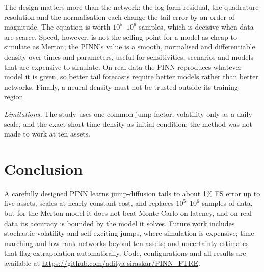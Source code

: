 \documentclass[conference]{IEEEtran}
\begin{document}
The design matters more than the network: the log-form residual, the quadrature resolution and the normalisation
each change the tail error by an order of magnitude. The equation is worth $10^5$--$10^6$ samples, which is decisive
when data are scarce. Speed, however, is not the selling point for a model as cheap to simulate as Merton; the
PINN's value is a smooth, normalised and differentiable density over times and parameters, useful for
sensitivities, scenarios and models that are expensive to simulate. On real data the PINN reproduces whatever model
it is given, so better tail forecasts require better models rather than better networks. Finally, a neural density
must not be trusted outside its training region.

\emph{Limitations.} The study uses one common jump factor, volatility only as a daily scale, and the exact
short-time density as initial condition; the method was not made to work at ten assets.

\section{Conclusion}

A carefully designed PINN learns jump-diffusion tails to about 1\% ES error up to five assets, scales at nearly
constant cost, and replaces $10^5$--$10^6$ samples of data, but for the Merton model it does not beat Monte Carlo on
latency, and on real data its accuracy is bounded by the model it solves. Future work includes stochastic
volatility and self-exciting jumps, where simulation is expensive; time-marching and low-rank networks beyond ten
assets; and uncertainty estimates that flag extrapolation automatically. Code, configurations and all results are
available at \url{https://github.com/aditya-siraskar/PINN_FTRE}.

\FloatBarrier   %


\end{document}
